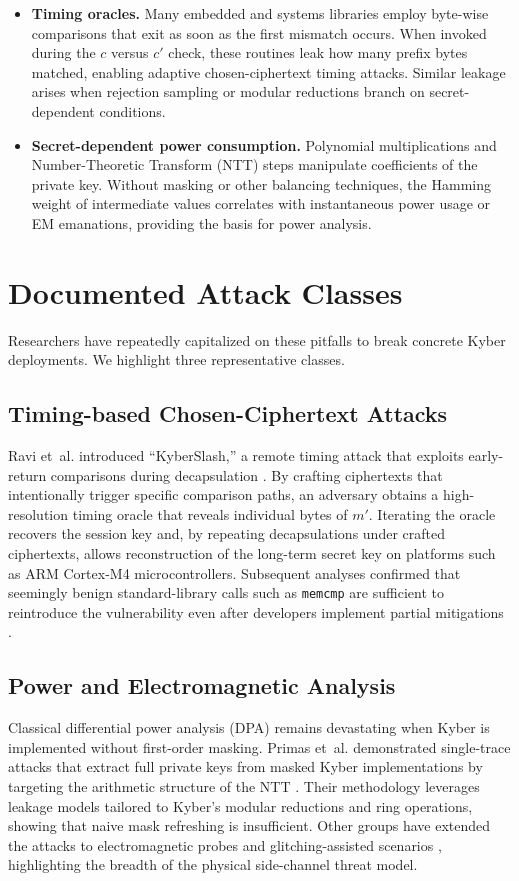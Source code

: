 \documentclass[11pt,a4paper]{article}
\begin{document}
\begin{itemize}
    \item \textbf{Timing oracles.} Many embedded and systems libraries employ byte-wise comparisons that exit as soon as the first mismatch occurs.
    When invoked during the $c$ versus $c'$ check, these routines leak how many prefix bytes matched, enabling adaptive chosen-ciphertext timing attacks.
    Similar leakage arises when rejection sampling or modular reductions branch on secret-dependent conditions.
    
    \item \textbf{Secret-dependent power consumption.} Polynomial multiplications and Number-Theoretic Transform (NTT) steps manipulate coefficients of the private key.
    Without masking or other balancing techniques, the Hamming weight of intermediate values correlates with instantaneous power usage or EM emanations, providing the basis for power analysis.
\end{itemize}

\section{Documented Attack Classes}
\label{sec:attacks}
Researchers have repeatedly capitalized on these pitfalls to break concrete Kyber deployments.
We highlight three representative classes.

\subsection{Timing-based Chosen-Ciphertext Attacks}
Ravi et~al. introduced ``KyberSlash,'' a remote timing attack that exploits early-return comparisons during decapsulation \cite{ravi2022kyberslash}.
By crafting ciphertexts that intentionally trigger specific comparison paths, an adversary obtains a high-resolution timing oracle that reveals individual bytes of $m'$.
Iterating the oracle recovers the session key and, by repeating decapsulations under crafted ciphertexts, allows reconstruction of the long-term secret key on platforms such as ARM Cortex-M4 microcontrollers.
Subsequent analyses confirmed that seemingly benign standard-library calls such as \texttt{memcmp} are sufficient to reintroduce the vulnerability even after developers implement partial mitigations \cite{pessl2023faults}.

\subsection{Power and Electromagnetic Analysis}
Classical differential power analysis (DPA) remains devastating when Kyber is implemented without first-order masking.
Primas et~al. demonstrated single-trace attacks that extract full private keys from masked Kyber implementations by targeting the arithmetic structure of the NTT \cite{primas2021single}.
Their methodology leverages leakage models tailored to Kyber's modular reductions and ring operations, showing that naive mask refreshing is insufficient.
Other groups have extended the attacks to electromagnetic probes and glitching-assisted scenarios \cite{moussa2022sca}, highlighting the breadth of the physical side-channel threat model.
\end{document}
